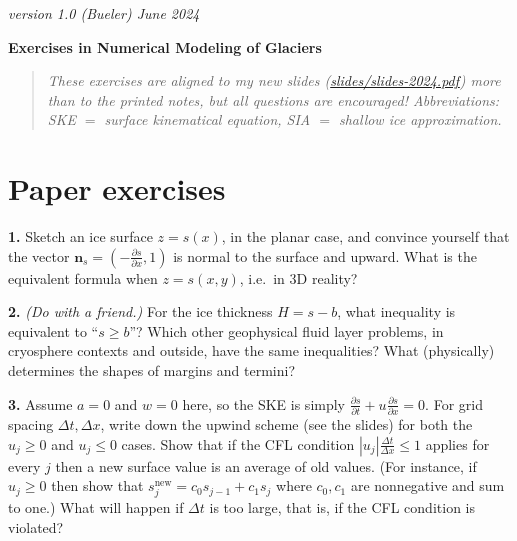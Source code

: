 \documentclass[12pt]{amsart}
\newcommand{\bn}{\mathbf{n}}
\newcommand{\prob}[1]{\bigskip\noindent\textbf{#1.}\quad }
\begin{document}
\scriptsize \hfill \emph{version 1.0 (Bueler) June 2024}
\normalsize\medskip

\large\centerline{\textbf{Exercises in Numerical Modeling of Glaciers}}
\medskip

\normalsize
\begin{quote}
\emph{These exercises are aligned to my new slides ({\small\emph{\href{https://github.com/bueler/mccarthy/blob/master/slides/slides-2024.pdf}{slides/slides-2024.pdf}}}) more than to the printed notes, but all questions are encouraged!  Abbreviations: SKE $=$ surface kinematical equation, SIA $=$ shallow ice approximation.}
\end{quote}
\medskip
\thispagestyle{empty}

\section*{Paper exercises}

\prob{1}  Sketch an ice surface $z=s(x)$, in the planar case, and convince yourself that the vector $\bn_s = (-\frac{\partial s}{\partial x},1)$ is normal to the surface and upward.  What is the equivalent formula when $z=s(x,y)$, i.e.~in 3D reality?

\prob{2}  \emph{(Do with a friend.)}  For the ice thickness $H=s-b$, what inequality is equivalent to ``$s\ge b$''?   Which other geophysical fluid layer problems, in cryosphere contexts and outside, have the same inequalities?  What (physically) determines the shapes of margins and termini?

\prob{3}  Assume $a=0$ and $w=0$ here, so the SKE is simply $\frac{\partial s}{\partial t} + u \frac{\partial s}{\partial x} = 0$.  For grid spacing $\Delta t,\Delta x$, write down the upwind scheme (see the slides) for both the $u_j\ge 0$ and $u_j\le 0$ cases.  Show that if the CFL condition $|u_j| \frac{\Delta t}{\Delta x} \le 1$ applies for every $j$ then a new surface value is an average of old values.  (For instance, if $u_j\ge 0$ then show that $s_j^{\text{new}} = c_0 s_{j-1} + c_1 s_j$ where $c_0,c_1$ are nonnegative and sum to one.)  What will happen if $\Delta t$ is too large, that is, if the CFL condition is violated?
\end{document}
